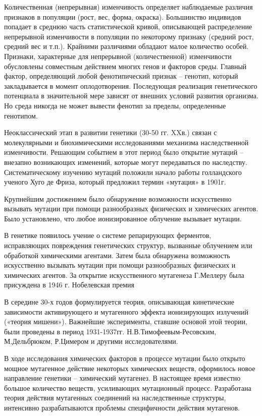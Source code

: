 \documentclass[exam_answers.tex]{subfiles}
\begin{document}
Количественная (непрерывная) изменчивость определяет наблюдаемые
различия признаков в популяции (рост, вес, форма, окраска). Большинство
индивидов попадает в среднюю часть статистической кривой, описывающей
распределение непрерывной изменчивости в популяции по некоторому
признаку (средний рост, средний вес и т.п.). Крайними различиями обладают
малое количество особей. Признаки, характерные для непрерывной
(количественной) изменчивости обусловлены совместным действием многих
генов и факторов среды. Главный фактор, определяющий любой
фенотипический признак – генотип, который закладывается в момент
оплодотворения. Последующая реализация генетического потенциала в
значительной мере зависят от внешних условий развития организма. Но среда
никогда не может вывести фенотип за пределы, определенные генотипом.

Неоклассический этап в развитии генетики (30-50 гг. XXв.) связан с
молекулярными и биохимическими исследованиями механизма наследственной
изменчивости. Решающим событием в этот период было открытие мутаций –
внезапно возникающих изменений, которые могут передаваться по наследству.
Систематическому изучению мутаций положили начало работы голландского
ученого Хуго де Фриза, который предложил термин «мутация» в 1901г.

Крупнейшим достижением было обнаружение возможности искусственно
вызывать мутации при помощи разнообразных физических и химических
агентов. Было установлено, что любое ионизированное облучение вызывает
мутации.

В генетике появилось учение о системе репарирующих ферментов,
исправляющих повреждения генетических структур, вызванные облучением
или обработкой химическими агентами.
Затем была обнаружена возможность
искусственно вызывать мутации при помощи разнообразных физических и
химических агентов. За открытие искусственного мутагенеза Г.Меллеру
была присуждена в 1946 г. Нобелевская премия

В середине 30-х годов формулируется теория, описывающая кинетические
зависимости активирующего и мутагенного эффекта ионизирующих излучений
(«теория мишени»). Важнейшие эксперименты, ставшие основой этой теории,
были проведены в период 1931-1937гг. Н.В.Тимофеевым-Ресовским,
М.Дельбрюком, Р.Цимером и другими исследователями.

В ходе исследования химических факторов в процессе мутации было
открыто мощное мутагенное действие некоторых химических веществ,
оформилось новое направление генетики – химический мутагенез.
В настоящее время известно большое количество веществ, усиливающих
мутационный процесс. Разработана теория действия мутагенных соединений на
наследственные структуры, интенсивно разрабатываются проблемы
специфичности действия мутагенов.
\end{document}
